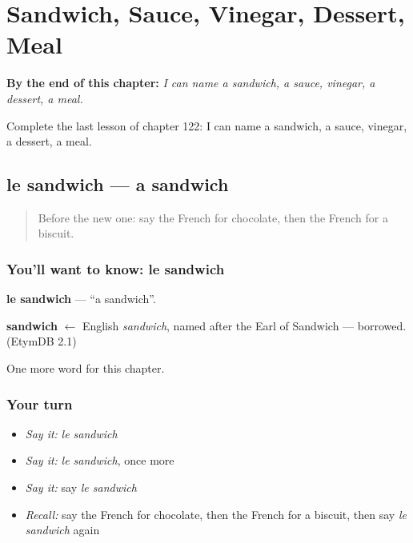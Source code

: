 
\chapter{Sandwich, Sauce, Vinegar, Dessert, Meal}
\label{ch:fr-sandwich-sauce-vinegar-dessert-meal}

\begin{chapteropening}
\textbf{By the end of this chapter:} \emph{I can name a sandwich, a sauce, vinegar, a dessert, a meal.}

Complete the last lesson of chapter 122: I can name a sandwich, a sauce, vinegar, a dessert, a meal.
\end{chapteropening}

\section[le sandwich]{le sandwich — a sandwich}

\label{lesson:FR-C122-sandwich}



\begin{quote}
Before the new one: say the French for chocolate, then the French for a biscuit.
\end{quote}

\subsection*{You'll want to know: le sandwich}
\textbf{le sandwich} — \textquotedblleft{}a sandwich\textquotedblright{}.

\begin{cousinweb}
\textbf{sandwich} $\leftarrow$ English \emph{sandwich}, named after the Earl of Sandwich — borrowed. (EtymDB 2.1)
\end{cousinweb}

\begin{grammarlens}[title={What you've built}]
One more word for this chapter.
\end{grammarlens}

\subsection*{Your turn}
\begin{itemize}
\raggedright
  \item \emph{Say it:} \emph{le sandwich}
  \item \emph{Say it:} \emph{le sandwich}, once more
  \item \emph{Say it:} say \emph{le sandwich}
  \item \emph{Recall:} say the French for chocolate, then the French for a biscuit, then say \emph{le sandwich} again
\end{itemize}

